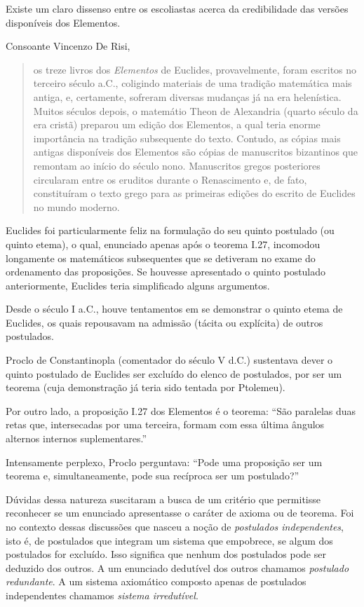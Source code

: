 \documentclass{hipatia}
\begin{document}
Existe um claro dissenso entre os escoliastas acerca da credibilidade das versões disponíveis dos Elementos. 

Consoante Vincenzo De Risi, 
\begin{quote}
os treze livros dos \emph{Elementos} de Euclides, provavelmente, foram escritos no terceiro século a.C., coligindo materiais de uma tradição matemática mais antiga, e, certamente, sofreram diversas mudanças já na era helenística. Muitos séculos depois, o matemátio Theon de Alexandria (quarto século da era cristã) preparou um edição dos Elementos, a qual teria enorme importância na tradição subsequente do texto. Contudo, as cópias mais antigas disponíveis dos Elementos são cópias de manuscritos bizantinos que remontam ao início do século nono. Manuscritos gregos posteriores circularam entre os eruditos durante o Renascimento e, de fato, constituíram o texto grego para as primeiras edições do escrito de Euclides no mundo moderno.  \cite[p.  595]{risi2016}
\end{quote}


Euclides foi particularmente feliz na formulação do seu quinto postulado (ou quinto etema), o qual, enunciado apenas após o teorema I.27, incomodou longamente os matemáticos subsequentes que se detiveram no exame do ordenamento das proposições. Se houvesse apresentado o quinto postulado anteriormente, Euclides teria simplificado alguns argumentos.

Desde o século I a.C., houve tentamentos em se demonstrar o quinto etema de Euclides, os quais repousavam na admissão (tácita ou explícita) de outros postulados. \cite[p. 2]{bonola1906}

Proclo de Constantinopla (comentador do século V d.C.) sustentava dever o quinto postulado de Euclides ser excluído do elenco de postulados, por ser um teorema (cuja demonstração já teria sido tentada por Ptolemeu).  \cite[p. 68]{coolidge1940}

Por outro lado, a  proposição I.27 dos Elementos é o teorema: ``São paralelas duas retas que, intersecadas por uma terceira, formam com essa última ângulos alternos internos suplementares.''

Intensamente perplexo, Proclo perguntava: ``Pode uma proposição ser um teorema e, simultaneamente, pode sua recíproca ser um postulado?''

Dúvidas dessa natureza suscitaram a busca de um critério que permitisse reconhecer se um enunciado apresentasse o caráter de axioma ou de teorema. Foi no contexto dessas discussões que nasceu a noção de \emph{postulados independentes}, isto é, de postulados que integram um sistema que empobrece, se algum dos postulados for excluído. Isso significa que nenhum dos postulados pode ser deduzido dos outros. A um enunciado dedutível dos outros chamamos \emph{postulado redundante}.  A um sistema axiomático composto apenas de postulados independentes chamamos \emph{sistema irredutível}.  \cite[p. 131]{moise1963}\cite[p. 985]{scanlan1988}
\end{document}
